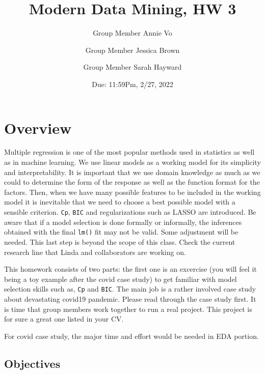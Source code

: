 \documentclass[
]{article}
\title{Modern Data Mining, HW 3}
\author{Group Member Annie Vo \and Group Member Jessica Brown \and Group
Member Sarah Hayward}
\date{Due: 11:59Pm, 2/27, 2022}
\begin{document}
\maketitle

{
\hypersetup{linkcolor=}
\setcounter{tocdepth}{4}
\tableofcontents
}
\pagebreak

\hypertarget{overview}{%
\section{Overview}\label{overview}}

Multiple regression is one of the most popular methods used in
statistics as well as in machine learning. We use linear models as a
working model for its simplicity and interpretability. It is important
that we use domain knowledge as much as we could to determine the form
of the response as well as the function format for the factors. Then,
when we have many possible features to be included in the working model
it is inevitable that we need to choose a best possible model with a
sensible criterion. \texttt{Cp}, \texttt{BIC} and regularizations such
as LASSO are introduced. Be aware that if a model selection is done
formally or informally, the inferences obtained with the final
\texttt{lm()} fit may not be valid. Some adjustment will be needed. This
last step is beyond the scope of this class. Check the current research
line that Linda and collaborators are working on.

This homework consists of two parts: the first one is an excercise (you
will feel it being a toy example after the covid case study) to get
familiar with model selection skills such as, \texttt{Cp} and
\texttt{BIC}. The main job is a rather involved case study about
devastating covid19 pandemic. Please read through the case study first.
It is time that group members work together to run a real project. This
project is for sure a great one listed in your CV.

For covid case study, the major time and effort would be needed in EDA
portion.

\hypertarget{objectives}{%
\subsection{Objectives}\label{objectives}}
\end{document}
